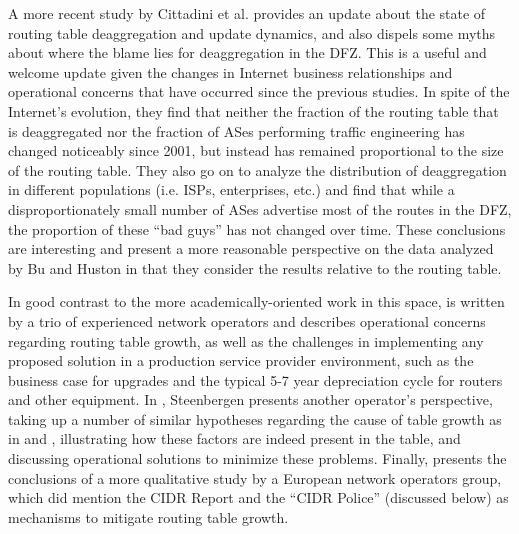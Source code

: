 A more recent study by Cittadini et al. \cite{Cittadini:2010pi} provides an
update about the state of routing table deaggregation and update dynamics, and
also dispels some myths about where the blame lies for deaggregation in the
DFZ. This is a useful and welcome update given the changes in Internet business
relationships and operational concerns that have occurred since the previous
studies. In spite of the Internet's evolution, they find that neither the
fraction of the routing table that is deaggregated nor the fraction of ASes
performing traffic engineering has changed noticeably since 2001, but instead
has remained proportional to the size of the routing table. They also go on to
analyze the distribution of deaggregation in different populations (i.e. ISPs,
enterprises, etc.) and find that while a disproportionately small number of
ASes advertise most of the routes in the DFZ, the proportion of these ``bad
guys'' has not changed over time. These conclusions are interesting and present
a more reasonable perspective on the data analyzed by Bu and Huston in that
they consider the results relative to the routing table.

In good contrast to the more academically-oriented work in this space,
\cite{Zhao:2001ly} is written by a trio of experienced network operators and
describes operational concerns regarding routing table growth, as well as
the challenges in implementing any proposed solution in a production service
provider environment, such as the business case for upgrades and the typical
5-7 year depreciation cycle for routers and other equipment. In
\cite{Steenbergen:2010nx}, Steenbergen presents another operator's perspective,
taking up a number of similar hypotheses regarding the cause of table growth as
in \cite{Bu:2004fk} and \cite{Cittadini:2010pi}, illustrating how these factors
are indeed present in the table, and discussing operational solutions to
minimize these problems. Finally, \cite{Smith:2006vn} presents the conclusions
of a more qualitative study by a European network operators group, which did
mention the CIDR Report and the ``CIDR Police'' (discussed below) as mechanisms
to mitigate routing table growth.


